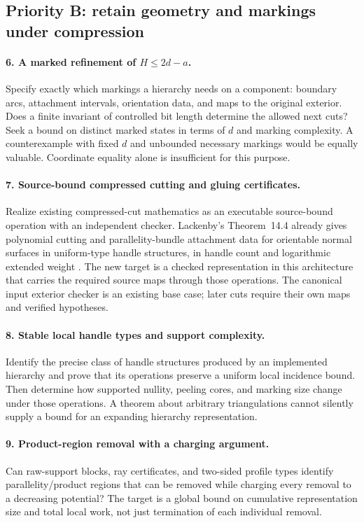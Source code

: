 \subsection{Priority B: retain geometry and markings under compression}

\paragraph{6. A marked refinement of $H\le2d-a$.}
Specify exactly which markings a hierarchy needs on a component: boundary
arcs, attachment intervals, orientation data, and maps to the original
exterior.  Does a finite invariant of controlled bit length determine the
allowed next cuts?  Seek a bound on distinct marked states in terms of $d$
and marking complexity.  A counterexample with fixed $d$ and unbounded
necessary markings would be equally valuable.  Coordinate equality alone
is insufficient for this purpose.

\paragraph{7. Source-bound compressed cutting and gluing certificates.}
Realize existing compressed-cut mathematics as an executable source-bound
operation with an independent checker.  Lackenby's Theorem~14.4 already gives
polynomial cutting and parallelity-bundle attachment data for orientable
normal surfaces in uniform-type handle structures, in handle count and
logarithmic extended weight \cite{Lackenby26}.  The new target is a checked
representation in this architecture that carries the required source maps
through those operations.  The canonical input exterior checker is an
existing base case; later cuts require their own maps and verified hypotheses.

\paragraph{8. Stable local handle types and support complexity.}
Identify the precise class of handle structures produced by an implemented
hierarchy and prove that its operations preserve a uniform local incidence
bound.  Then determine how supported nullity, peeling cores, and marking size
change under those operations.  A theorem about arbitrary triangulations
cannot silently supply a bound for an expanding hierarchy representation.

\paragraph{9. Product-region removal with a charging argument.}
Can raw-support blocks, ray certificates, and two-sided profile types identify
parallelity/product regions that can be removed while charging every removal
to a decreasing potential?  The target is a global bound on cumulative
representation size and total local work, not just termination of each
individual removal.

